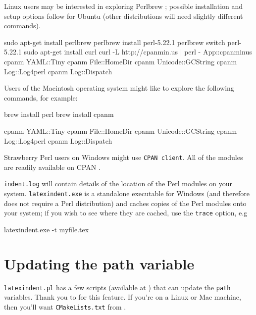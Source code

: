 		Linux users may be interested in exploring Perlbrew \cite{perlbrew}; possible
		installation and setup options follow for Ubuntu (other distributions will need slightly
		different commands).
		\begin{commandshell}
sudo apt-get install perlbrew
perlbrew install perl-5.22.1
perlbrew switch perl-5.22.1
sudo apt-get install curl
curl -L http://cpanmin.us | perl - App::cpanminus
cpanm YAML::Tiny
cpanm File::HomeDir
cpanm Unicode::GCString
cpanm Log::Log4perl
cpanm Log::Dispatch
\end{commandshell}

		Users of the Macintosh operating system might like to explore the following commands, for
		example:
		\begin{commandshell}
brew install perl
brew install cpanm

cpanm YAML::Tiny
cpanm File::HomeDir
cpanm Unicode::GCString
cpanm Log::Log4perl
cpanm Log::Dispatch
\end{commandshell}

		Strawberry Perl users on Windows might use \texttt{CPAN client}. All of the modules are
		readily available on CPAN \cite{cpan}.

		\texttt{indent.log} will contain details of the location
		of the Perl modules on your system.  \texttt{latexindent.exe} is a standalone executable
		for Windows (and therefore does not require a Perl distribution) and caches copies of the
		Perl modules onto your system; if you wish to see where they are cached, use the
		\texttt{trace} option, e.g
		\begin{dosprompt}
latexindent.exe -t myfile.tex
 \end{dosprompt}

	\section{Updating the path variable}\label{sec:updating-path}
	 \texttt{latexindent.pl} has a few scripts (available at \cite{latexindent-home}) that can
	 update the \texttt{path} variables. Thank you to \cite{jasjuang} for this
	 feature. If you're on a Linux or Mac machine, then you'll want \texttt{CMakeLists.txt}
	 from \cite{latexindent-home}.
